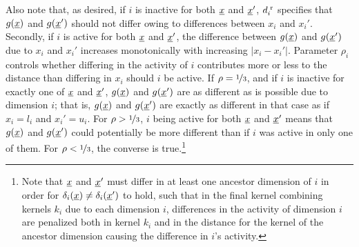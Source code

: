 \documentclass{article}
\newcommand{\vect}[1]{\underline{\smash{#1}}}
\renewcommand{\v}[1]{\vect{#1}}
\newcommand{\br}{^{\text{\textnormal{ r}}}}
\newcommand{\note}[1]{}
\renewcommand{\note}[1]{~\\\frame{\begin{minipage}[c]{\textwidth}\vspace{2pt}\center{#1}\vspace{2pt}\end{minipage}}\vspace{3pt}\\}
\begin{document}
Also note that, as desired, if $i$ is inactive for both $\v{x}$ and $\v{x}'$, $d\br_i$ specifies that $g(\v{x})$ and $g(\v{x}')$ should not differ owing to differences between $x_i$ and $x_i'$. Secondly, if $i$ is active for both $\v{x}$ and $\v{x}'$, the difference between $g(\v{x})$ and $g(\v{x}')$ due to $x_i$ and $x_i'$ increases monotonically with increasing $\left|x_i-x_i'\right|$. Parameter $\rho_i$ controls whether differing in the activity of $i$ contributes more or less to the distance than differing in $x_i$ should $i$ be active. If $\rho = \nicefrac{1}{3}$, and if $i$ is inactive for exactly one of $\v{x}$ and $\v{x}'$, $g(\v{x})$ and $g(\v{x}')$ are as different as is possible due to dimension $i$; that is, $g(\v{x})$ and $g(\v{x}')$ are exactly as different in that case as if $x_i=l_i$ and $x_i'=u_i$. For $\rho>\nicefrac{1}{3}$, $i$ being active for both $\v{x}$ and $\v{x}'$ means that $g(\v{x})$ and $g(\v{x}')$ could potentially be more different than if
$i$ was active in only one of them. For $\rho<\nicefrac{1}{3}$, the converse is true.\footnote{Note that $\v{x}$ and $\v{x}'$ must differ in at least one ancestor dimension of $i$ in order for $\delta_i(\v{x}) \neq \delta_i(\v{x}')$ to hold, such that in the final kernel combining kernels $k_i$ due to each dimension $i$, differences in the activity of dimension $i$ are penalized both in kernel $k_i$ and in the distance for the kernel of the ancestor dimension causing the difference in $i$'s activity.}
\end{document}
